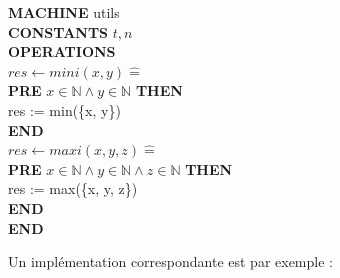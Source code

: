 \documentclass[10pt,a4paper]{article}
\newcommand{\Bequal}{\mathrel{\widehat{=}}}
\begin{document}
{\noindent \textbf{MACHINE} utils \\
\textbf{CONSTANTS} $t,n$ \\
\textbf{OPERATIONS} \\
$res \leftarrow mini(x, y) \Bequal$ \\
\hspace*{1em}  \textbf{PRE} $x \in \mathbb{N} \wedge  y \in \mathbb{N} $ \textbf{THEN} \\
\hspace*{2em} res := min(\{x, y\})  \\
\hspace*{1em} \textbf{END} \\
$res \leftarrow maxi(x, y, z) \Bequal$ \\
\hspace*{1em}  \textbf{PRE} $x \in \mathbb{N} \wedge  y \in \mathbb{N} \wedge z \in \mathbb{N}$ \textbf{THEN} \\
\hspace*{2em} res := max(\{x, y, z\})  \\
\hspace*{1em} \textbf{END} \\
\textbf{END}

Un implémentation correspondante est par exemple :

}
\end{document}
